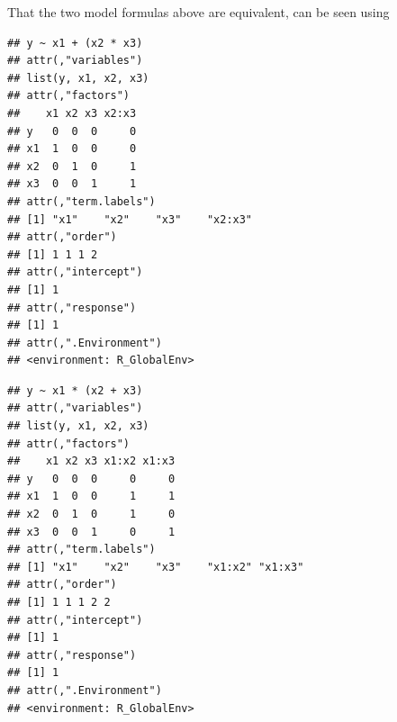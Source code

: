\documentclass[krantz2]{krantz}\usepackage{knitr}
\begin{document}
That the two model formulas above are equivalent, can be seen using 

\begin{knitrout}\footnotesize
{}\color{fgcolor}\begin{kframe}
\begin{alltt}
 \hlopt{~}  \hlopt{+}  \hlopt{*} 
\end{alltt}
\begin{verbatim}
## y ~ x1 + (x2 * x3)
## attr(,"variables")
## list(y, x1, x2, x3)
## attr(,"factors")
##    x1 x2 x3 x2:x3
## y   0  0  0     0
## x1  1  0  0     0
## x2  0  1  0     1
## x3  0  0  1     1
## attr(,"term.labels")
## [1] "x1"    "x2"    "x3"    "x2:x3"
## attr(,"order")
## [1] 1 1 1 2
## attr(,"intercept")
## [1] 1
## attr(,"response")
## [1] 1
## attr(,".Environment")
## <environment: R_GlobalEnv>
\end{verbatim}
\end{kframe}
\end{knitrout}

\begin{knitrout}\footnotesize
{}\color{fgcolor}\begin{kframe}
\begin{alltt}
 \hlopt{~}  \hlopt{*}  \hlopt{+} 
 \hlopt{~}  \hlopt{+}  \hlopt{+}  \hlopt{+} \hlopt{:} \hlopt{+} \hlopt{:}
\end{alltt}
\end{kframe}
\end{knitrout}

\begin{knitrout}\footnotesize
{}\color{fgcolor}\begin{kframe}
\begin{alltt}
 \hlopt{~}  \hlopt{*}  \hlopt{+} 
\end{alltt}
\begin{verbatim}
## y ~ x1 * (x2 + x3)
## attr(,"variables")
## list(y, x1, x2, x3)
## attr(,"factors")
##    x1 x2 x3 x1:x2 x1:x3
## y   0  0  0     0     0
## x1  1  0  0     1     1
## x2  0  1  0     1     0
## x3  0  0  1     0     1
## attr(,"term.labels")
## [1] "x1"    "x2"    "x3"    "x1:x2" "x1:x3"
## attr(,"order")
## [1] 1 1 1 2 2
## attr(,"intercept")
## [1] 1
## attr(,"response")
## [1] 1
## attr(,".Environment")
## <environment: R_GlobalEnv>
\end{verbatim}
\end{kframe}
\end{knitrout}
\end{document}
